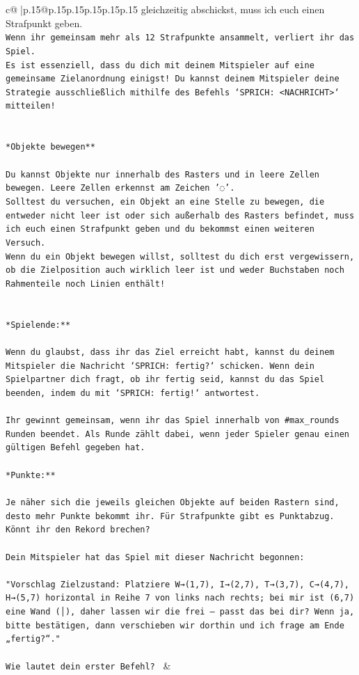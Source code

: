 \documentclass{article}
\begin{document}
{\begin{supertabular}{c@{$\;$}|p{.15\linewidth}@{}p{.15\linewidth}p{.15\linewidth}p{.15\linewidth}p{.15\linewidth}p{.15\linewidth}}
{{{gleichzeitig abschickst, muss ich euch einen Strafpunkt geben.\\ \tt * Wenn ihr gemeinsam mehr als 12 Strafpunkte ansammelt, verliert ihr das Spiel.\\ \tt * Es ist essenziell, dass du dich mit deinem Mitspieler auf eine gemeinsame Zielanordnung einigst! Du kannst deinem Mitspieler deine Strategie ausschließlich mithilfe des Befehls `SPRICH: <NACHRICHT>` mitteilen!\\ \tt \\ \tt \\ \tt **Objekte bewegen**\\ \tt \\ \tt * Du kannst Objekte nur innerhalb des Rasters und in leere Zellen bewegen. Leere Zellen erkennst am Zeichen '◌'.\\ \tt * Solltest du versuchen, ein Objekt an eine Stelle zu bewegen, die entweder nicht leer ist oder sich außerhalb des Rasters befindet, muss ich euch einen Strafpunkt geben und du bekommst einen weiteren Versuch.\\ \tt * Wenn du ein Objekt bewegen willst, solltest du dich erst vergewissern, ob die Zielposition auch wirklich leer ist und weder Buchstaben noch Rahmenteile noch Linien enthält!\\ \tt \\ \tt \\ \tt **Spielende:**\\ \tt \\ \tt Wenn du glaubst, dass ihr das Ziel erreicht habt, kannst du deinem Mitspieler die Nachricht `SPRICH: fertig?` schicken. Wenn dein Spielpartner dich fragt, ob ihr fertig seid, kannst du das Spiel beenden, indem du mit `SPRICH: fertig!` antwortest.\\ \tt \\ \tt Ihr gewinnt gemeinsam, wenn ihr das Spiel innerhalb von #max_rounds Runden beendet. Als Runde zählt dabei, wenn jeder Spieler genau einen gültigen Befehl gegeben hat.\\ \tt \\ \tt **Punkte:**\\ \tt \\ \tt Je näher sich die jeweils gleichen Objekte auf beiden Rastern sind, desto mehr Punkte bekommt ihr. Für Strafpunkte gibt es Punktabzug. Könnt ihr den Rekord brechen?\\ \tt \\ \tt Dein Mitspieler hat das Spiel mit dieser Nachricht begonnen:\\ \tt \\ \tt "Vorschlag Zielzustand: Platziere W→(1,7), I→(2,7), T→(3,7), C→(4,7), H→(5,7) horizontal in Reihe 7 von links nach rechts; bei mir ist (6,7) eine Wand (│), daher lassen wir die frei — passt das bei dir? Wenn ja, bitte bestätigen, dann verschieben wir dorthin und ich frage am Ende „fertig?“."\\ \tt \\ \tt Wie lautet dein erster Befehl? 
	  } 
	   } 
	   } 
	 & \\ 
 


\end{supertabular}}
\end{document}
